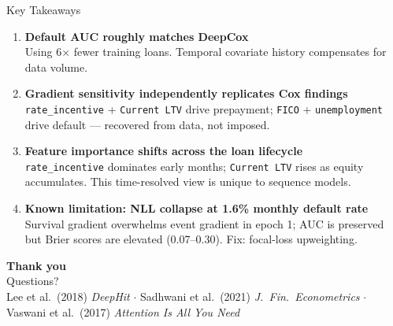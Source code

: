 \documentclass[10pt,aspectratio=169]{beamer}
\begin{document}
\begin{frame}{Key Takeaways}
    \begin{enumerate}\itemsep10pt
        \item \textbf{Default AUC roughly matches DeepCox}\\
              Using 6$\times$ fewer training loans.
              Temporal covariate history compensates for data volume.

        \item \textbf{Gradient sensitivity independently replicates Cox findings}\\
              \texttt{rate\_incentive} + \texttt{Current LTV} drive prepayment;
              \texttt{FICO} + \texttt{unemployment} drive default --- recovered from data, not imposed.

        \item \textbf{Feature importance shifts across the loan lifecycle}\\
              \texttt{rate\_incentive} dominates early months; \texttt{Current LTV} rises as equity
              accumulates. This time-resolved view is unique to sequence models.

        \item \textbf{Known limitation: NLL collapse at 1.6\% monthly default rate}\\
              Survival gradient overwhelms event gradient in epoch 1; AUC is preserved but
              Brier scores are elevated (0.07--0.30). Fix: focal-loss upweighting.
    \end{enumerate}
\end{frame}

\begin{frame}[plain]
    \vspace*{2em}
    \begin{center}
        {\Huge \textbf{Thank you}}\\[1.5em]
        {\Large Questions?}\\[2.5em]
        \small
        Lee et al.\ (2018) \textit{DeepHit} $\cdot$
        Sadhwani et al.\ (2021) \textit{J.\ Fin.\ Econometrics} $\cdot$
        Vaswani et al.\ (2017) \textit{Attention Is All You Need}
    \end{center}
\end{frame}
\end{document}
